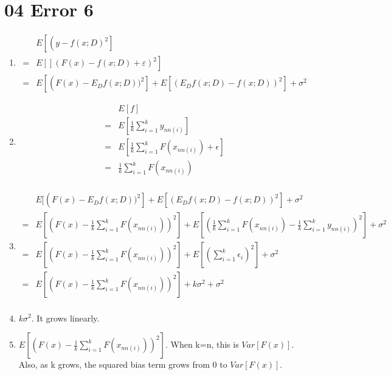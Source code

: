 \documentclass[10pt, oneside]{article}
\begin{document}
\section{04 Error 6}
\begin{enumerate}
	\item $$\begin{aligned}
	& E\left[\left(y-f(x ; D)^{2}\right]\right.\\
	=&\left.E [](F(x)-f(x ; D)+\varepsilon)^{2}\right] \\
	=& E\left[\left(F(x)-E_{D} f(x ; D))^{2}\right]+E\left[\left(E_{D} f(x ; D)-f(x ; D)\right)^{2}\right]+\sigma^{2}\right.
	\end{aligned}$$
	\item $$
	\begin{aligned}
	&E[f]\\
	=&E[\frac{1}{k}\sum_{i=1}^{k}y_{nn(i)}]\\
	=&E[\frac{1}{k}\sum_{i=1}^{k}F(x_{nn(i)})+\epsilon]\\
	=&\frac{1}{k}\sum_{i=1}^{k}F(x_{nn(i)})\\
	\end{aligned}
	$$
	\item $$
	\begin{aligned}
	&E[\left(F(x)-E_{D} f(x ; D))^{2}\right]+E\left[\left(E_{D} f(x ; D)-f(x ; D)\right)^{2}\right]+\sigma^{2}\\
	=&E\left[(F(x)-\frac{1}{k}\sum_{i=1}^{k}F(x_{nn(i)}))^2\right]+E\left[\left(\frac{1}{k}\sum_{i=1}^{k}F(x_{nn(i)})-\frac{1}{k}\sum_{i=1}^ky_{nn(i)}\right)^{2}\right]+\sigma^{2}\\
	=&E\left[(F(x)-\frac{1}{k}\sum_{i=1}^{k}F(x_{nn(i)}))^2\right]+E[(\sum_{i=1}^k\epsilon_i)^2]+\sigma^{2}\\
	=&E\left[(F(x)-\frac{1}{k}\sum_{i=1}^{k}F(x_{nn(i)}))^2\right]+k\sigma^2+\sigma^{2}\\
	\end{aligned}
	$$
	\item $k\sigma^2$. It grows linearly.
	\item $E\left[(F(x)-\frac{1}{k}\sum_{i=1}^{k}F(x_{nn(i)}))^2\right]$. When k=n, this is $Var[F(x)]$. Also, as k grows, the squared bias term grows from 0 to $Var[F(x)]$. 
\end{enumerate}
\end{document}
